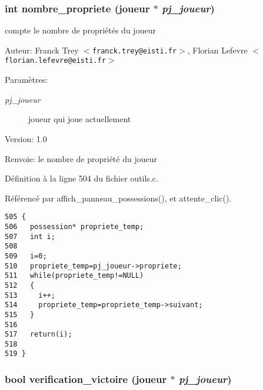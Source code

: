 \subsubsection{\setlength{\rightskip}{0pt plus 5cm}int nombre\_\-propriete ({\bf joueur} $\ast$ {\em pj\_\-joueur})}\label{outils_8h_72f8d3fa346a685e363d2aa16537c971}


compte le nombre de propri\'{e}t\'{e}s du joueur 

\begin{Desc}
\item[Auteur:]Franck Trey $<${\tt franck.trey@eisti.fr}$>$, Florian Lefevre $<${\tt florian.lefevre@eisti.fr}$>$\end{Desc}
\begin{Desc}
\item[Param\`{e}tres:]
\begin{description}
\item[{\em pj\_\-joueur}]joueur qui joue actuellement\end{description}
\end{Desc}
\begin{Desc}
\item[Version:]1.0 \end{Desc}
\begin{Desc}
\item[Renvoie:]le nombre de propri\'{e}t\'{e} du joueur \end{Desc}


D\'{e}finition \`{a} la ligne 504 du fichier outils.c.

R\'{e}f\'{e}renc\'{e} par affich\_\-panneau\_\-possessions(), et attente\_\-clic().

\begin{Code}\begin{verbatim}505 {
506   possession* propriete_temp;
507   int i;
508 
509   i=0;
510   propriete_temp=pj_joueur->propriete;
511   while(propriete_temp!=NULL)
512   {
513     i++;
514     propriete_temp=propriete_temp->suivant;
515   }
516   
517   return(i);
518   
519 }
\end{verbatim}\end{Code}


\subsubsection{\setlength{\rightskip}{0pt plus 5cm}bool verification\_\-victoire ({\bf joueur} $\ast$ {\em pj\_\-joueur})}\label{outils_8h_f24e5d6a3c8482c890219439e48dfe74}


